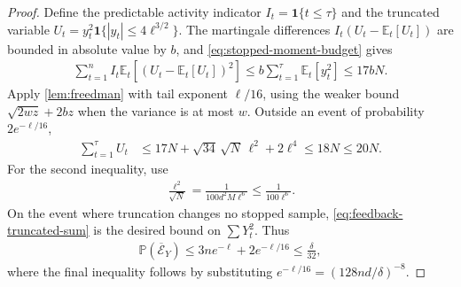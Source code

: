 \documentclass{article}
\newcommand{\E}{\mathbb E}
\newcommand{\Pp}{\mathbb P}
\newcommand{\1}{\mathbf 1}
\begin{document}
\begin{proof}
    Define the predictable activity indicator $I_t=\1\{t\leq\tau\}$ and
    the truncated variable
    $U_t=y_t^2\1\{|y_t|\leq4\ell^{3/2}\}$.
    The martingale differences $I_t(U_t-\E_t[U_t])$ are bounded in
    absolute value by $b$, and \eqref{eq:stopped-moment-budget} gives
    \begin{align}
        \sum_{t=1}^n I_t\E_t[(U_t-\E_t[U_t])^2]
        \leq b\sum_{t=1}^\tau\E_t[y_t^2]
        \leq17bN.
    \end{align}
    Apply \cref{lem:freedman} with tail exponent $\ell/16$, using the
    weaker bound $\sqrt{2wz}+2bz$ when the variance is at most $w$.
    Outside an event of probability $2e^{-\ell/16}$,
    \begin{align}
        \sum_{t=1}^\tau U_t
         & \leq17N+\sqrt{34}\,\sqrt N\,\ell^2+2\ell^4
        \leq18N\leq20N.
        \label{eq:feedback-truncated-sum}
    \end{align}
    For the second inequality, use
    \begin{align}
        \frac{\ell^2}{\sqrt N}
        =\frac{1}{100d^2M\ell^6}
        \leq\frac{1}{100\ell^6}.
        \label{eq:feedback-cap-to-budget}
    \end{align}
    On the event where truncation changes no stopped sample,
    \eqref{eq:feedback-truncated-sum} is the desired bound on
    $\sum Y_t^2$. Thus
    \begin{align}
        \Pp(\overline{\mathcal E}_Y)
        \leq3ne^{-\ell}+2e^{-\ell/16}
        \leq\frac{\delta}{32},
    \end{align}
    where the final inequality follows by substituting
    $e^{-\ell/16}=(128nd/\delta)^{-8}$.
\end{proof}
\end{document}
